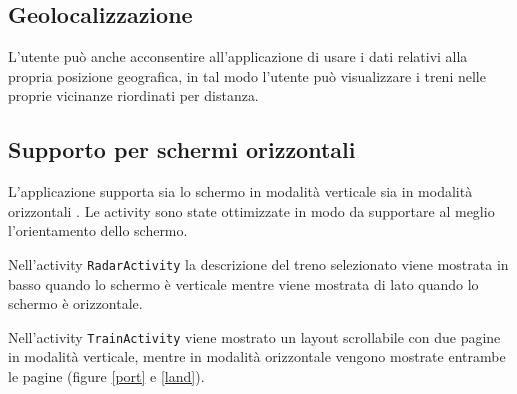 \documentclass[a4paper,10pt]{article}
\begin{document}
  \subsection{Geolocalizzazione}
    L'utente può anche acconsentire all'applicazione di usare i dati relativi alla propria posizione geografica, in tal modo l'utente può visualizzare i treni nelle proprie vicinanze riordinati per distanza.

  \subsection{Supporto per schermi orizzontali}
    L'applicazione supporta sia lo schermo in modalità verticale sia in modalità orizzontali \cite{compatibility}. Le activity sono state ottimizzate in modo da supportare al meglio l'orientamento dello schermo.

    \medskip
    \noindent
    Nell'activity \texttt{RadarActivity} la descrizione del treno selezionato viene mostrata in basso quando lo schermo è verticale mentre viene mostrata di lato quando lo schermo è orizzontale.

    \medskip
    \noindent
    Nell'activity \texttt{TrainActivity} viene mostrato un layout scrollabile con due pagine in modalità verticale, mentre in modalità orizzontale vengono mostrate entrambe le pagine (figure \ref{port} e \ref{land}).
\end{document}
